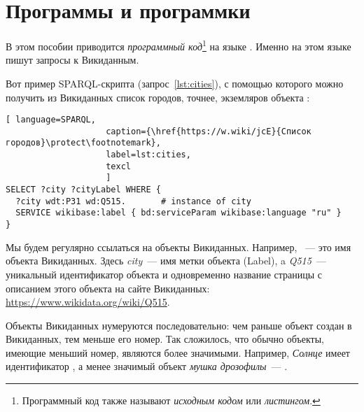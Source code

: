 

\chapter{Программы и программки}
\label{ch:listing_about}

В этом пособии приводится \emph{программный код}\footnote[][0cm]{%
    Программный код также называют  \emph{исходным кодом} или 
    \emph{листингом}.
%   
} на языке . 
Именно на этом языке пишут запросы к Викиданным.


Вот пример SPARQL-скрипта (запрос~\ref{lst:cities}), 
с помощью которого можно получить из Викиданных список городов, 
точнее, экземляров объекта
:

\begin{lstlisting}[ language=SPARQL, 
                    caption={\href{https://w.wiki/jcE}{Список городов}\protect\footnotemark},
                    label=lst:cities,
                    texcl 
                    ]
SELECT ?city ?cityLabel WHERE { 
  ?city wdt:P31 wd:Q515.       # instance of city
  SERVICE wikibase:label { bd:serviceParam wikibase:language "ru" }
}
\end{lstlisting}%

Мы будем регулярно ссылаться на объекты Викиданных. 
Например, ~--- это имя объекта Викиданных. 
Здесь \emph{city}~--- имя метки объекта (Label), 
a \emph{Q515}~--- уникальный идентификатор объекта 
и одновременно название страницы с описанием этого объекта на сайте Викиданных: \href{https://www.wikidata.org/wiki/Q515}{https://www.wikidata.org/wiki/Q515}.

\label{WDObjectsNumbering}
Объекты Викиданных нумеруются последовательно: чем раньше 
объект создан в Викиданных, тем меньше его номер. 
Так сложилось, что обычно объекты, имеющие меньший номер, являются более значимыми. 
Например, \emph{Солнце} имеет идентификатор , а менее значимый объект \emph{мушка дрозофилы}~--- .
